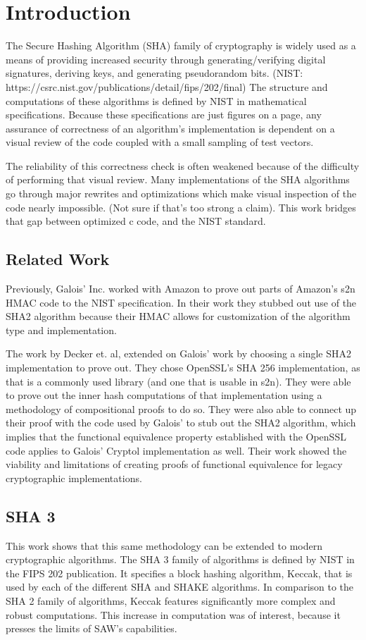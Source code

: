 \section{Introduction}\label{sec:introduction}
  The Secure Hashing Algorithm (SHA) family of cryptography is widely used as a means of providing increased security through generating/verifying digital signatures, deriving keys, and generating pseudorandom bits. (NIST: https://csrc.nist.gov/publications/detail/fips/202/final)  
  The structure and computations of these algorithms is defined by NIST in mathematical specifications.  
  Because these specifications are just figures on a page, any assurance of correctness of an algorithm’s implementation is dependent on a visual review of the code coupled with a small sampling of test vectors.
  
  The reliability of this correctness check is often weakened because of the difficulty of performing that visual review.  
  Many implementations of the SHA algorithms go through major rewrites and optimizations which make visual inspection of the code nearly impossible. (Not sure if that’s too strong a claim).
  This work bridges that gap between optimized c code, and the NIST standard.

  \subsection{Related Work}
  Previously, Galois’ Inc. worked with Amazon to prove out parts of Amazon’s s2n HMAC code to the NIST specification.  
In their work they stubbed out use of the SHA2 algorithm because their HMAC allows for customization of the algorithm type and implementation.

The work by Decker et. al, extended on Galois' work by choosing a single SHA2 implementation to prove out.  
They chose OpenSSL’s SHA 256 implementation, as that is a commonly used library (and one that is usable in s2n).  
They were able to prove out the inner hash computations of that implementation using a methodology of compositional proofs to do so.  
They were also able to connect up their proof with the code used by Galois’ to stub out the SHA2 algorithm, which implies that the functional equivalence property established with the OpenSSL code applies to Galois' Cryptol implementation as well.  
Their work showed the viability and limitations of creating proofs of functional equivalence for legacy cryptographic implementations.

\subsection{SHA 3}
This work shows that this same methodology can be extended to modern cryptographic algorithms.
The SHA 3 family of algorithms is defined by NIST in the FIPS 202 publication.
It specifies a block hashing algorithm, Keccak, that is used by each of the different SHA and SHAKE algorithms.
In comparison to the SHA 2 family of algorithms, Keccak features significantly more complex and robust computations.
This increase in computation was of interest, because it presses the limits of SAW's capabilities.

